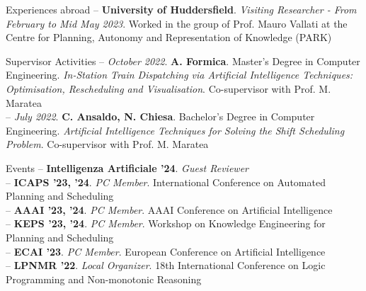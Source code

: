 \documentclass{resume} %
\begin{document}
\begin{rSection}{Experiences abroad}
-- \textbf{University of Huddersfield}. \textit{Visiting Researcher - From February to Mid May 2023}. Worked in the group of Prof. Mauro Vallati at the Centre for Planning, Autonomy and Representation of Knowledge (PARK)  
\end{rSection}

\begin{rSection}{Supervisor Activities}
-- \textit{October 2022}. \textbf{A. Formica}. Master's Degree in Computer Engineering. \textit{In-Station Train Dispatching via Artificial Intelligence Techniques: Optimisation, Rescheduling and Visualisation}. Co-supervisor with Prof. M. Maratea\\
-- \textit{July 2022}. \textbf{C. Ansaldo, N. Chiesa}. Bachelor's Degree in Computer Engineering. \textit{Artificial Intelligence Techniques for Solving the Shift Scheduling Problem}. Co-supervisor with Prof. M. Maratea
\end{rSection}

\break

\begin{rSection}{Events}
-- \textbf{Intelligenza Artificiale '24}. \textit{Guest Reviewer} \\
-- \textbf{ICAPS '23, '24}. \textit{PC Member}. International Conference on Automated Planning and Scheduling \\
-- \textbf{AAAI '23, '24}. \textit{PC Member}. AAAI Conference on Artificial Intelligence \\
-- \textbf{KEPS '23, '24}. \textit{PC Member}. Workshop on Knowledge Engineering for Planning and Scheduling \\
-- \textbf{ECAI '23}. \textit{PC Member}. European Conference on Artificial Intelligence \\
-- \textbf{LPNMR '22}. \textit{Local Organizer}. 18th International Conference on Logic Programming and Non-monotonic Reasoning  
\end{rSection}


%
%
%
\end{document}
